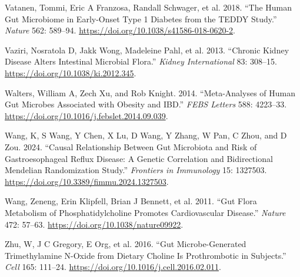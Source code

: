 \documentclass[
  11pt,
]{article}
\newlength{\cslhangindent}
\newenvironment{CSLReferences}[2] %
 {\begin{list}{}{%
  \setlength{\itemindent}{0pt}
  \setlength{\leftmargin}{0pt}
  \setlength{\parsep}{0pt}
  \ifodd #1
   \setlength{\leftmargin}{\cslhangindent}
   \setlength{\itemindent}{-1\cslhangindent}
  \fi
  \setlength{\itemsep}{#2\baselineskip}}}
 {\end{list}}
\begin{document}
\begin{CSLReferences}{1}{0}
Vatanen, Tommi, Eric A Franzosa, Randall Schwager, et al. 2018. {``The
Human Gut Microbiome in Early-Onset Type 1 Diabetes from the {TEDDY}
Study.''} \emph{Nature} 562: 589--94.
\url{https://doi.org/10.1038/s41586-018-0620-2}.

Vaziri, Nosratola D, Jakk Wong, Madeleine Pahl, et al. 2013. {``Chronic
Kidney Disease Alters Intestinal Microbial Flora.''} \emph{Kidney
International} 83: 308--15. \url{https://doi.org/10.1038/ki.2012.345}.

Walters, William A, Zech Xu, and Rob Knight. 2014. {``Meta-Analyses of
Human Gut Microbes Associated with Obesity and {IBD}.''} \emph{FEBS
Letters} 588: 4223--33.
\url{https://doi.org/10.1016/j.febslet.2014.09.039}.

Wang, K, S Wang, Y Chen, X Lu, D Wang, Y Zhang, W Pan, C Zhou, and D
Zou. 2024. {``Causal Relationship Between Gut Microbiota and Risk of
Gastroesophageal Reflux Disease: A Genetic Correlation and Bidirectional
{M}endelian Randomization Study.''} \emph{Frontiers in Immunology} 15:
1327503. \url{https://doi.org/10.3389/fimmu.2024.1327503}.

Wang, Zeneng, Erin Klipfell, Brian J Bennett, et al. 2011. {``Gut Flora
Metabolism of Phosphatidylcholine Promotes Cardiovascular Disease.''}
\emph{Nature} 472: 57--63. \url{https://doi.org/10.1038/nature09922}.

Zhu, W, J C Gregory, E Org, et al. 2016. {``Gut Microbe-Generated
Trimethylamine {N}-Oxide from Dietary Choline Is Prothrombotic in
Subjects.''} \emph{Cell} 165: 111--24.
\url{https://doi.org/10.1016/j.cell.2016.02.011}.

\end{CSLReferences}
\end{document}
